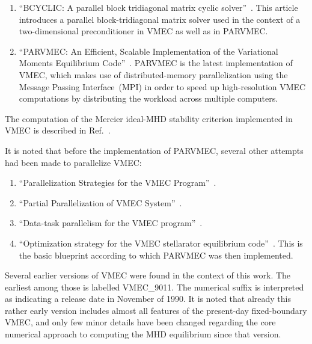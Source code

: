 \documentclass[a4paper,11pt]{book}
\begin{document}
\begin{enumerate}
       This is yet another attempt at spectral condensation.
       It is the basis for the latest version of the DESCUR curve fitting tool (see above)
       and this representation was also found to be implemented as an option in VMEC,
       but not used in practise.
 \item ``BCYCLIC: A parallel block tridiagonal matrix cyclic solver''~\cite{hirshman_etal_2010}.
       This article introduces a parallel block-tridiagonal matrix solver
       used in the context of a two-dimensional preconditioner in VMEC
       as well as in PARVMEC.
 \item ``PARVMEC: An Efficient, Scalable Implementation of the Variational Moments Equilibrium Code''~\cite{seal_hirshman_2016}.
       PARVMEC is the latest implementation of VMEC, which makes use of distributed-memory
       parallelization using the Message Passing Interface~(MPI)
       in order to speed up high-resolution VMEC computations
       by distributing the workload across multiple computers.
\end{enumerate}
%
The computation of the Mercier ideal-MHD stability criterion
implemented in VMEC is described in Ref.~\cite{beta_2}.


It is noted that before the implementation of PARVMEC,
several other attempts had been made to parallelize VMEC:
\begin{enumerate}
  \item ``Parallelization Strategies for the VMEC Program''~\cite{romero_1998}.
  \item ``Partial Parallelization of VMEC System''~\cite{msc_zhou}.
  \item ``Data-task parallelism for the VMEC program''~\cite{romero_2001}.
  \item ``Optimization strategy for the VMEC stellarator equilibrium code''~\cite{merz_2013}.
        This is the basic blueprint according to which PARVMEC was then implemented.
\end{enumerate}
%
Several earlier versions of VMEC were found in the context of this work.
The earliest among those is labelled VMEC\_9011.
The numerical suffix is interpreted as indicating a release date in November of 1990.
%
It is noted that already this rather early version
includes almost all features of the present-day fixed-boundary VMEC,
and only few minor details have been changed regarding the core numerical approach
to computing the MHD equilibrium since that version.

\FloatBarrier
\end{document}
